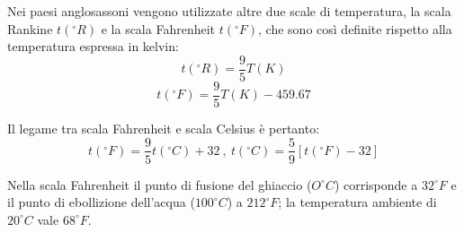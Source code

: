 \documentclass[class=book, crop=false, oneside, 12pt]{standalone}
\begin{document}
Nei paesi anglosassoni vengono utilizzate altre due scale di temperatura, la scala Rankine \(t ( ^{\circ} R)\) e la scala Fahrenheit \( t ( ^{\circ} F)\), che sono così definite rispetto alla temperatura espressa in kelvin:
\begin{equation*}
    t ( ^{\circ} R) = \frac{9}{5} T (K)
\end{equation*}
\begin{equation*}
    t (^{\circ} F) = \frac{9}{5} T (K) - 459.67
\end{equation*}

Il legame tra scala Fahrenheit e scala Celsius è pertanto:
\begin{equation*}
    t (^{\circ} F) = \frac{9}{5} t (^{\circ} C) + 32 \ , \ t(^{\circ} C) = \frac{5}{9} \left[t (^{\circ} F ) - 32\right]
\end{equation*}

Nella scala Fahrenheit il punto di fusione del ghiaccio (\(O ^{\circ} C \)) corrisponde a \(32 ^{\circ} F\) e il punto di ebollizione dell'acqua (\(100 ^{\circ} C\)) a \(212 ^{\circ} F\); la temperatura ambiente di \(20 ^{\circ} C\) vale \(68 ^{\circ} F\). 
\end{document}
